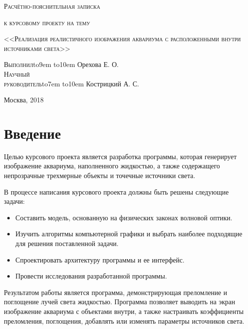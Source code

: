 \documentclass[14pt,a4paper]{extarticle}
\def\hrf#1{\hbox to#1{\hrulefill}}
\begin{document}
	\begin{center}
		\textsc{\large Расчётно-пояснительная записка}\\
		\bigskip
		
		\textsc{к курсовому проекту на тему}
		
		\vspace{0.4cm}
		\textsc{\large <<Реализация реалистичного изображения аквариума с расположенными внутри источниками света>>}
	\end{center}

	\vspace{4cm}
	
	\begin{flushleft}
		\textsc{Выполнил}\hrf{9em} \hrf{10em} Орехова Е. О.\qquad~\\
		\textsc{Научный}\\
		\textsc{руководитель}\hrf{7em} \hrf{10em} Кострицкий А. С.
	\end{flushleft}
	\vspace{2cm}
	\begin{center}
		Москва, 2018
	\end{center}
\clearpage
	
\def\contentaname{Содержание}
\tableofcontents %
\clearpage

\section*{Введение}
    Целью курсового проекта является разработка программы, которая генерирует изображение аквариума,
    наполненного жидкостью, а также содержащего непрозрачные трехмерные объекты и точечные источники света.
    
    В процессе написания курсового проекта должны быть решены следующие задачи:
    \begin{itemize}
    	\item Составить модель, основанную на физических законах волновой оптики.
    	\item Изучить алгоритмы компьютерной графики и выбрать наиболее подходящие для решения поставленной задачи.
    	\item Спроектировать архитектуру программы и ее интерфейс.
    	\item Провести исследования разработанной программы.
    \end{itemize}

	Результатом работы является программа, демонстрирующая преломление и поглощение лучей света жидкостью.
	Программа позволяет выводить на экран изображение аквариума с объектами внутри,
	а также настраивать коэффициенты преломления, поглощения, добавлять или изменять параметры источников света.
\clearpage
\end{document}
